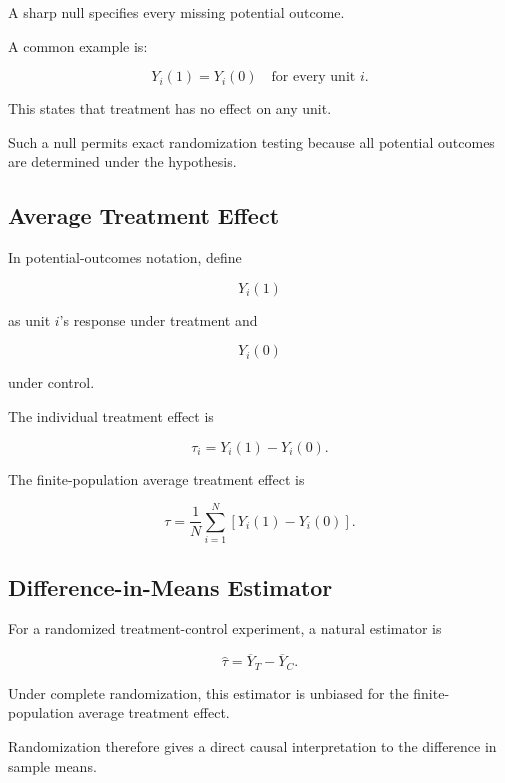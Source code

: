 A sharp null specifies every missing potential outcome.

A common example is:

\[
\boxed{
Y_i(1)=Y_i(0)
\quad
\text{for every unit }i.
}
\]

This states that treatment has no effect on any unit.

Such a null permits exact randomization testing because all potential
outcomes are determined under the hypothesis.

\subsection{Average Treatment Effect}
\label{subsec:average-treatment-effect-design}

In potential-outcomes notation, define

\[
Y_i(1)
\]

as unit \(i\)'s response under treatment and

\[
Y_i(0)
\]

under control.

The individual treatment effect is

\[
\boxed{
\tau_i
=
Y_i(1)-Y_i(0).
}
\]

The finite-population average treatment effect is

\[
\boxed{
\tau
=
\frac1N
\sum_{i=1}^{N}
\left[
Y_i(1)-Y_i(0)
\right].
}
\]

\subsection{Difference-in-Means Estimator}
\label{subsec:difference-in-means-estimator-design}

For a randomized treatment-control experiment, a natural estimator is

\[
\boxed{
\widehat{\tau}
=
\overline{Y}_T
-
\overline{Y}_C.
}
\]

Under complete randomization, this estimator is unbiased for the
finite-population average treatment effect.

Randomization therefore gives a direct causal interpretation to the
difference in sample means.

